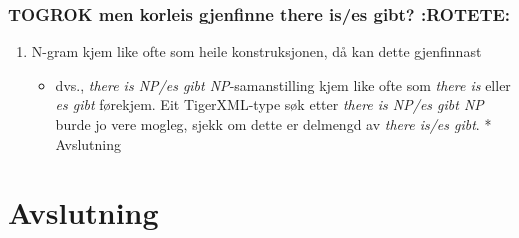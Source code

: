 \documentclass[11pt,a4paper,oneside,draft]{book}
\begin{document}
\subsection{\textbf{TOGROK} men korleis gjenfinne there is/es gibt? \textbf{:ROTETE:}}
\label{sec-5.2.2}

\begin{enumerate}
\item N-gram kjem like ofte som heile konstruksjonen, då kan dette
   gjenfinnast

\begin{itemize}
\item dvs., \emph{there is NP/es gibt NP}-samanstilling kjem like ofte som
     \emph{there is} eller \emph{es gibt} førekjem. Eit TigerXML-type søk etter
     \emph{there is NP/es gibt NP} burde jo vere mogleg, sjekk om dette er
     delmengd av \emph{there is/es gibt}. * Avslutning
\end{itemize}

\end{enumerate}
\chapter{Avslutning}
\label{sec-6}




\end{document}
